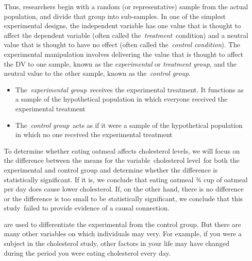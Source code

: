 \begin{refsection}
Thus, researchers begin with a random (or representative) sample from the actual population, and divide that group into sub-samples. In one of the simplest experimental designs, the independent variable has one value that is thought to affect the dependent variable (often called the \emph{treatment} condition) and a neutral value that is thought to have no effect (often called the \emph{control condition}). The experimental manipulation involves delivering the value that is thought to affect the DV to one sample, known as the \emph{experimental} or \emph{treatment group}, and the neutral value to the other sample, known as the \emph{control group}.

\begin{itemize}
\item The \emph{experimental group} receives the experimental treatment. It functions as a sample of the hypothetical population in which everyone received the experimental treatment

\item The \emph{control group} acts as if it were a sample of the hypothetical population in which no one received the experimental treatment

\end{itemize}

To determine whether eating oatmeal affects cholesterol levels, we will focus on the difference between the means for the variable cholesterol level for both the experimental and control group and determine whether the difference is statistically significant. If it is, we conclude that eating oatmeal ¾ cup of oatmeal per day does cause lower cholesterol. If, on the other hand, there is no difference or the difference is too small to be statistically significant, we conclude that this study failed to provide evidence of a causal connection.

 are used to differentiate the experimental from the control group. But there are many other variables on which individuals may very. For example, if you were a subject in the cholesterol study, other factors in your life may have changed during the period you were eating cholesterol every day. 

\begin{marginfigure}
 \begin{center}


\end{center}
\end{marginfigure}
\end{refsection}
